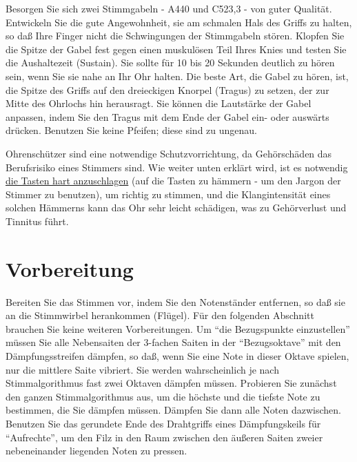 \hypertarget{c2_3_gabel}{}

Besorgen Sie sich zwei Stimmgabeln - A440 und C523,3 - von guter Qualität.
Entwickeln Sie die gute Angewohnheit, sie am schmalen Hals des Griffs zu halten, so daß Ihre Finger nicht die Schwingungen der Stimmgabeln stören.
Klopfen Sie die Spitze der Gabel fest gegen einen muskulösen Teil Ihres Knies und testen Sie die Aushaltezeit (Sustain).
Sie sollte für 10 bis 20 Sekunden deutlich zu hören sein, wenn Sie sie nahe an Ihr Ohr halten.
Die beste Art, die Gabel zu hören, ist, die Spitze des Griffs auf den dreieckigen Knorpel (Tragus) zu setzen, der zur Mitte des Ohrlochs hin herausragt.
Sie können die Lautstärke der Gabel anpassen, indem Sie den Tragus mit dem Ende der Gabel ein- oder auswärts drücken.
Benutzen Sie keine Pfeifen; diese sind zu ungenau.

Ohrenschützer sind eine notwendige Schutzvorrichtung, da Gehörschäden das Berufsrisiko eines Stimmers sind.
Wie weiter unten erklärt wird, ist es notwendig \hyperlink{c2_5_infi}{die Tasten hart anzuschlagen} (auf die Tasten zu hämmern - um den Jargon der Stimmer zu benutzen), um richtig zu stimmen, und die Klangintensität eines solchen Hämmerns kann das Ohr sehr leicht schädigen, was zu Gehörverlust und Tinnitus führt.
 

\chapter{Vorbereitung}\hypertarget{c2_4}{}

Bereiten Sie das Stimmen vor, indem Sie den Notenständer entfernen, so daß sie an die Stimmwirbel herankommen (Flügel).
Für den folgenden Abschnitt brauchen Sie keine weiteren Vorbereitungen.
Um \enquote{die Bezugspunkte einzustellen} müssen Sie alle Nebensaiten der 3-fachen Saiten in der \enquote{Bezugsoktave} mit den Dämpfungsstreifen dämpfen, so daß, wenn Sie eine Note in dieser Oktave spielen, nur die mittlere Saite vibriert.
Sie werden wahrscheinlich je nach Stimmalgorithmus fast zwei Oktaven dämpfen müssen.
Probieren Sie zunächst den ganzen Stimmalgorithmus aus, um die höchste und die tiefste Note zu bestimmen, die Sie dämpfen müssen.
Dämpfen Sie dann alle Noten dazwischen.
Benutzen Sie das gerundete Ende des Drahtgriffs eines Dämpfungskeils für \enquote{Aufrechte}, um den Filz in den Raum zwischen den äußeren Saiten zweier nebeneinander liegenden Noten zu pressen.
 


